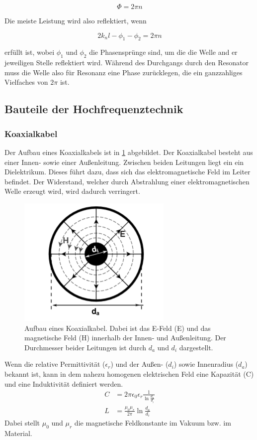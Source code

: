 \begin{equation}
	\Phi = 2\pi n
\end{equation}

Die meiste Leistung wird also reflektiert, wenn

\begin{equation}
	2 k_n l - \phi_1 -\phi_2 = 2\pi n
\end{equation}

erfüllt ist, wobei $\phi_1$ und $\phi_2$ die Phasensprünge sind, um die die Welle and er jeweiligen Stelle reflektiert wird. Während des Durchgangs durch den Resonator muss die Welle also für Resonanz eine Phase zurücklegen, die ein ganzzahliges Vielfaches von $2\pi$ ist.

\subsection{Bauteile der Hochfrequenztechnik}
\subsubsection{Koaxialkabel}
Der Aufbau eines Koaxialkabels ist in \cref{Koax} abgebildet. Der Koaxialkabel besteht aus einer Innen- sowie einer Außenleitung. Zwischen beiden Leitungen liegt ein ein Dielektrikum. Dieses führt dazu, dass sich das elektromagnetische Feld im Leiter befindet. Der Widerstand, welcher durch Abstrahlung einer elektromagnetischen Welle erzeugt wird, wird dadurch verringert. 
\begin{figure}[h]
	\centering
	\includegraphics[scale=1]{Koaxial.png}
	\caption{Aufbau eines Koaxialkabel. Dabei ist das E-Feld (E) und das magnetische Feld (H) innerhalb der Innen- und Außenleitung. Der Durchmesser beider Leitungen ist durch $d_a$ und $d_i$ dargestellt.}
	\label{Koax}
\end{figure}
Wenn die relative Permittivität ($\epsilon_r$) und der Außen- ($d_i$) sowie Innenradius ($d_a$) bekannt ist, kann in dem nahezu homogenen elektrischen Feld eine Kapazität (C) und eine Induktivität definiert werden.
\begin{align*}
	C &= 2 \pi \epsilon_0 \epsilon_r \frac{1}{\ln{\frac{d_a}{d_i}}} \\
	L &= \frac{\mu_0 \mu_r }{2 \pi} \ln{\frac{d_a}{d_i}}
\end{align*}
Dabei stellt $\mu_0$ und $\mu_r$ die magnetische Feldkonstante im Vakuum bzw. im Material.

